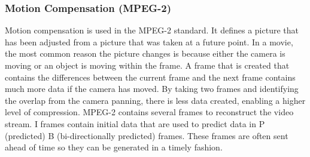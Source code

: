\documentclass[12pt]{CPP}
\begin{document}
\subsubsection{Motion Compensation (MPEG-2)}
Motion compensation is used in the MPEG-2 standard. It defines a picture that has been adjusted from a picture that was taken at a future point. In a movie, the most common reason the picture changes is because either the camera is moving or an object is moving within the frame. A frame that is created that contains the differences between the current frame and the next frame contains much more data if the camera has moved. By taking two frames and identifying the overlap from the camera panning, there is less data created, enabling a higher level of compression. MPEG-2 contains several frames to reconstruct the video stream. I frames contain initial data that are used to predict data in P (predicted) B (bi-directionally predicted) frames. These frames are often sent ahead of time so they can be generated in a timely fashion. \citep{Tudor}
\end{document}
